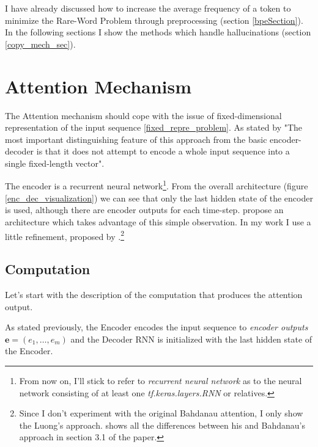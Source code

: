 I have already discussed how to increase the average frequency of a token to minimize the Rare-Word Problem through preprocessing (section \ref{bpeSection}). In the following sections I show the methods which handle hallucinations (section \ref{copy_mech_sec}).

\section{Attention Mechanism}

The Attention mechanism should cope with the issue of fixed-dimensional representation of the input sequence \ref{fixed_repre_problem}. As stated by \citep{bahdanau2016neural} "The most important distinguishing feature of this approach from the basic encoder-decoder is that it does not attempt to encode a whole input sequence into a single fixed-length vector".

The encoder is a recurrent neural network\footnote{From now on, I'll stick to refer to \emph{recurrent neural network} as to the neural network consisting of at least one \emph{tf.keras.layers.RNN} or relatives.}. From the overall architecture (figure \ref{enc_dec_visualization}) we can see that only the last hidden state of the encoder is used, although there are encoder outputs for each time-step. \citep{bahdanau2016neural} propose an architecture which takes advantage of this simple observation. In my work I use a little refinement, proposed by \citep{luong2015effective}.\footnote{Since I don't experiment with the original Bahdanau attention, I only show the Luong's approach. \citep{luong2015effective} shows all the differences between his and Bahdanau's approach in section 3.1 of the paper.}

\subsection{Computation}

Let's start with the description of the computation that produces the attention output.

As stated previously, the Encoder encodes the input sequence to \emph{encoder outputs} $\boldsymbol{e} = (e_1, \dots, e_m)$ and the Decoder RNN is initialized with the last hidden state of the Encoder.

